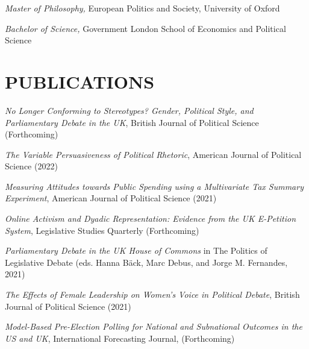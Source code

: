 \documentclass[centered]{res}
\begin{document}
\begin{resume}
\vspace{-.25cm}

		{\sl Master of Philosophy,} European Politics and Society, University of Oxford
		

\vspace{-.25cm}
		
		{\sl Bachelor of Science,} Government
                London School of Economics and Political Science

\section{PUBLICATIONS} 

{\sl No Longer Conforming to Stereotypes? Gender, Political Style, and Parliamentary Debate in the UK}, British Journal of Political Science (Forthcoming)

\vspace{-.25cm}

{\sl The Variable Persuasiveness of Political Rhetoric},  American Journal of Political Science (2022)

\vspace{-.25cm}

{\sl Measuring Attitudes towards Public Spending using a Multivariate Tax Summary Experiment},  American Journal of Political Science (2021)

\vspace{-.25cm}

{\sl Online Activism and Dyadic Representation: Evidence from the UK E-Petition System}, 
Legislative Studies Quarterly (Forthcoming) 

\vspace{-.25cm}

{\sl Parliamentary Debate in the UK House of Commons} in The Politics of Legislative Debate (eds. Hanna B{\"a}ck, Marc Debus, and Jorge M. Fernandes, 2021) 

\vspace{-.25cm}

{\sl The Effects of Female Leadership on Women's Voice in Political Debate}, British Journal of Political Science (2021) 

\vspace{-.25cm}

{\sl Model-Based Pre-Election Polling for National and Subnational Outcomes in the US and UK}, 
International Forecasting Journal, (Forthcoming)


\end{resume}
\end{document}
